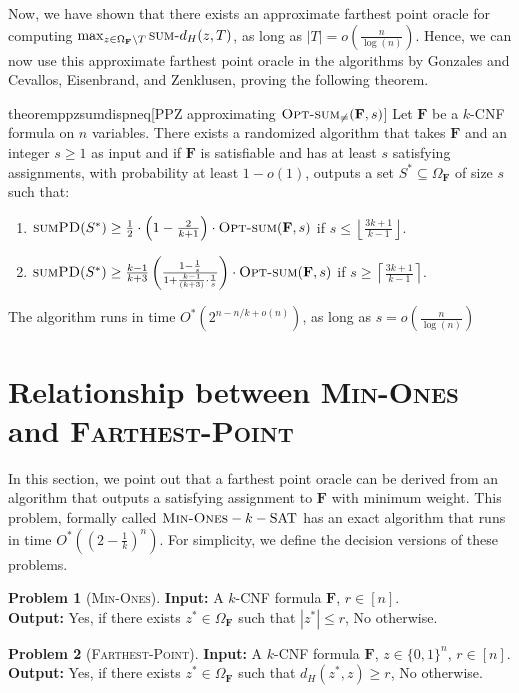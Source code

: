 \documentclass[11pt, letterpaper]{article}
\theoremstyle{definition}
\newtheorem{problem}{Problem}
\newcommand{\Q}[1]{\{0,1\}^{#1}}
\newcommand{\f}{\mathbf{F}}
\newcommand{\Om}{\Omega_{\f}}
\newcommand{\SPD}{\textsc{sumPD}}
\newcommand{\sumd}{\textsc{sum-}d_H}
\newcommand{\opts}{\textsc{Opt-sum}}
\newcommand{\ceil}[1]{{\left\lceil{#1}\right\rceil}}
\newcommand{\floor}[1]{{\left\lfloor{#1}\right\rfloor}}
\begin{document}
Now, we have shown that there exists an approximate farthest point oracle for computing 
     $\max_{z \in \Om \setminus T}\sumd (z,T)$, as long as $|T|=o\left(\frac{n}{\log(n)}\right)$. Hence, we can now use this approximate farthest point oracle in the algorithms by Gonzales and Cevallos, Eisenbrand, and Zenklusen, proving the following theorem.  
     \begin{restatable}{theorem}{ppzsumdispneq}[PPZ approximating $\opts_{\neq}(\f,s)$] \label{thm:ppz-for-sumdispneq}
    Let $\f$ be a $k$-CNF formula on $n$ variables. There exists a randomized algorithm  that takes $\f$ and an integer $s \geq 1$ as input and if $\f$ is satisfiable and has at least $s$ satisfying assignments, with probability at least $1-o(1)$, outputs a set $S^* \subseteq \Om$ of size $s$ such that:
    \begin{enumerate}
        \item $\SPD(S^*) \geq \frac{1}{2}\cdot \left(1-\frac{2}{k+1}\right) \cdot \opts(\f,s)$ if $s \leq \floor{\frac{3k+1}{k-1}}$.
        \item $\SPD(S^*) \geq \frac{k-1}{k+3}\left(\frac{1-\frac{1}{s}}{1+\frac{k-1}{(k+3)}\cdot \frac{1}{s} }\right) \cdot \opts(\f,s)$ if $s \geq \ceil{\frac{3k+1}{k-1}}$. 
    \end{enumerate}
    The algorithm runs in time $O^*\left(2^{n-n/k + o(n)}\right)$, as long as $s=o\left(\frac{n}{\log(n)}\right)$
\end{restatable}
 \section{Relationship between \textsc{Min-Ones} and \textsc{Farthest-Point}}
\label{app:minones}
In this section, we point out that a farthest point oracle can be derived from an algorithm that outputs a satisfying assignment to $\f$ with minimum weight. This problem, formally called $\textsc{Min-Ones}-k-\text{SAT}$ has an exact algorithm that runs in time $O^*\left( \left(2-\frac{1}{k}\right)^n\right)$. For simplicity, we define the decision versions of these problems. 
\begin{problem}[\textsc{Min-Ones}]
    \textbf{Input: }A $k$-CNF formula $\f$, $r \in [n]$. \\
\textbf{Output: }Yes, if there exists $z^* \in \Om$ such that $|z^*| \leq r$, No otherwise.
\end{problem}
\begin{problem}[\textsc{Farthest-Point}]
    \textbf{Input: }A $k$-CNF formula $\f$, $z \in \Q{n}$, $r \in [n]$. \\
\textbf{Output: }Yes, if there exists $z^* \in \Om$ such that $d_H(z^*, z) \geq r$, No otherwise.
\end{problem}
\end{document}
